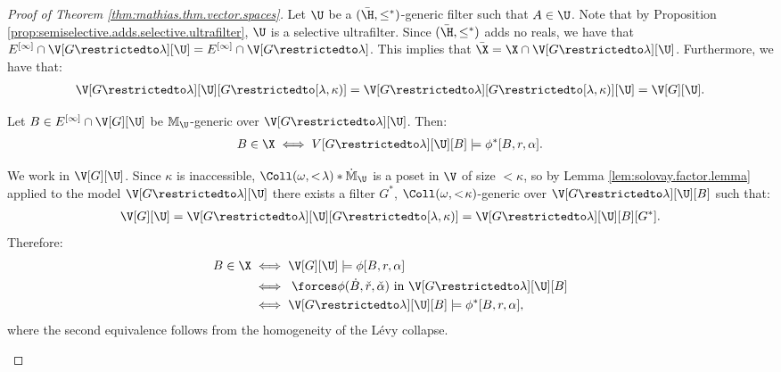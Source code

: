 \documentclass[11pt,reqno]{amsart}
\begin{document}
\begin{proof}[Proof of Theorem \ref{thm:mathias.thm.vector.spaces}]
    Let $\U$ be a $(\bar{\H},\leq^*)$-generic filter such that $A \in \U$. Note that by Proposition \ref{prop:semiselective.adds.selective.ultrafilter}, $\U$ is a selective ultrafilter. Since $(\bar{\H},\leq^*)$ adds no reals, we have that $E^{[\infty]} \cap \V[G\restrictedto\lambda][\U] = E^{[\infty]} \cap \V[G\restrictedto\lambda]$. This implies that $\bar{\X} = \X \cap \V[G\restrictedto\lambda][\U]$. Furthermore, we have that:
    \begin{align*}
        \V[G\restrictedto\lambda][\U][G\restrictedto[\lambda,\kappa)] = \V[G\restrictedto\lambda][G\restrictedto[\lambda,\kappa)][\U] = \V[G][\U].
    \end{align*}

    \begin{claim}
        Let $B \in E^{[\infty]} \cap \V[G][\U]$ be $\mathbb{M}_\U$-generic over $\V[G\restrictedto\lambda][\U]$. Then:
        \begin{align*}
            B \in \X \iff V[G\restrictedto\lambda][\U][B] \models \phi^*[B,r,\alpha].
        \end{align*}
    \end{claim}

    \begin{midproof}
        We work in $\V[G][\U]$. Since $\kappa$ is inaccessible, $\Coll(\omega,<\!\lambda) * \dot{\mathbb{M}}_\U$ is a poset in $\V$ of size $<\!\kappa$, so by Lemma \ref{lem:solovay.factor.lemma} applied to the model $\V[G\restrictedto\lambda][\U]$ there exists a filter $G^*$, $\Coll(\omega,<\!\kappa)$-generic over $\V[G\restrictedto\lambda][\U][B]$ such that:
        \begin{align*}
            \V[G][\U] = \V[G\restrictedto\lambda][\U][G\restrictedto[\lambda,\kappa)] = \V[G\restrictedto\lambda][\U][B][G^*].
        \end{align*}
        Therefore:
        \begin{align*}
            B \in \X &\iff \V[G][\U] \models \phi[B,r,\alpha] \\
            &\iff \;\forces \phi(\dot{B},\check{r},\check{\alpha}) \text{ in $\V[G\restrictedto\lambda][\U][B]$} \\
            &\iff \V[G\restrictedto\lambda][\U][B] \models \phi^*[B,r,\alpha],
        \end{align*}
        where the second equivalence follows from the homogeneity of the L\'{e}vy collapse.
    \end{midproof}
    

\end{proof}
\end{document}

